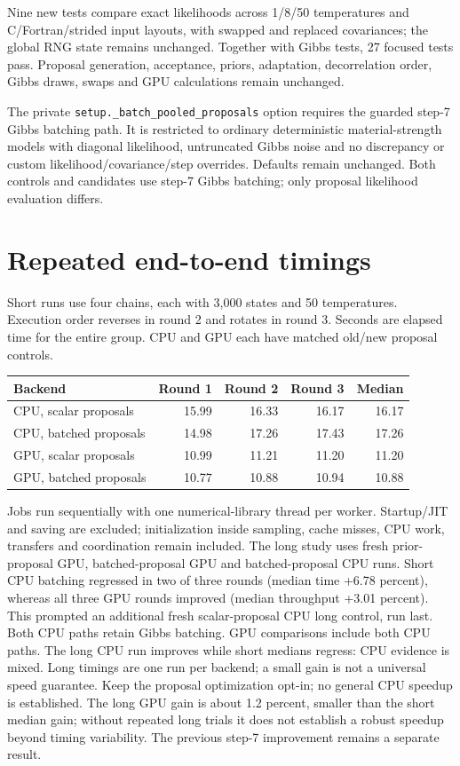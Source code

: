 \documentclass[11pt]{article}
\begin{document}
Nine new tests compare exact likelihoods across 1/8/50 temperatures and
C/Fortran/strided input layouts, with swapped and replaced covariances; the
global RNG state remains unchanged. Together with Gibbs tests, 27 focused
tests pass. Proposal generation, acceptance, priors, adaptation, decorrelation
order, Gibbs draws, swaps and GPU calculations remain unchanged.

The private \texttt{setup.\_batch\_pooled\_proposals} option requires the guarded
step-7 Gibbs batching path. It is restricted to ordinary deterministic
material-strength models with diagonal likelihood, untruncated Gibbs noise and
no discrepancy or custom likelihood/covariance/step overrides. Defaults remain
unchanged. Both controls and candidates use step-7 Gibbs batching; only proposal
likelihood evaluation differs.
\section*{Repeated end-to-end timings}
Short runs use four chains, each with 3,000 states and 50 temperatures. Execution
order reverses in round 2 and rotates in round 3. Seconds are elapsed time for the
entire group. CPU and GPU each have matched old/new proposal controls.
\begin{center}\begin{tabular}{lrrrr}\toprule
Backend & Round 1 & Round 2 & Round 3 & Median\\\midrule
CPU, scalar proposals & 15.99 & 16.33 & 16.17 & 16.17\\
CPU, batched proposals & 14.98 & 17.26 & 17.43 & 17.26\\
GPU, scalar proposals & 10.99 & 11.21 & 11.20 & 11.20\\
GPU, batched proposals & 10.77 & 10.88 & 10.94 & 10.88\\
\bottomrule\end{tabular}\end{center}
Jobs run sequentially with one numerical-library thread per worker. Startup/JIT
and saving are excluded; initialization inside sampling, cache misses, CPU work,
transfers and coordination remain included. The long study uses fresh prior-proposal
GPU, batched-proposal GPU and batched-proposal CPU runs.
Short CPU batching regressed in two of three rounds (median time +6.78 percent),
whereas all three GPU rounds improved (median throughput +3.01 percent).
This prompted an additional fresh scalar-proposal CPU long control, run last.
Both CPU paths retain Gibbs batching. GPU comparisons include both CPU paths.
The long CPU run improves while short medians regress: CPU evidence is mixed.
Long timings are one run per backend; a small gain is not a universal speed guarantee.
Keep the proposal optimization opt-in; no general CPU speedup is established.
The long GPU gain is about 1.2 percent, smaller than the short median gain;
without repeated long trials it does not establish a robust speedup beyond
timing variability. The previous step-7 improvement remains a separate result.
\end{document}
